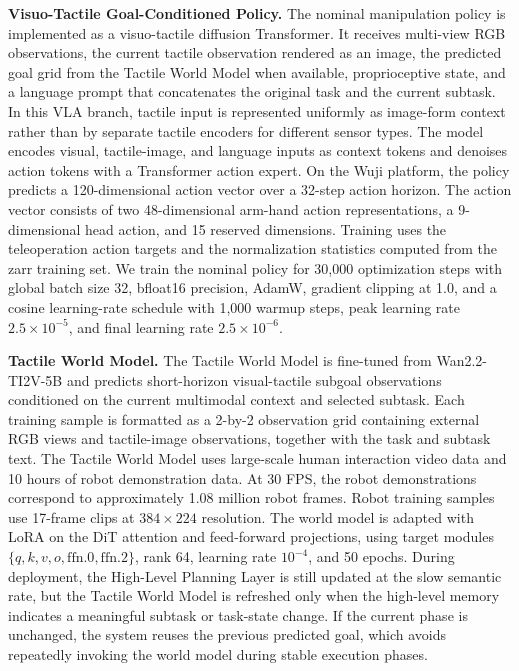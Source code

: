\noindent\textbf{Visuo-Tactile Goal-Conditioned Policy.}
The nominal manipulation policy is implemented as a visuo-tactile diffusion Transformer.
It receives multi-view RGB observations, the current tactile observation rendered as an image, the predicted goal grid from the Tactile World Model when available, proprioceptive state, and a language prompt that concatenates the original task and the current subtask.
In this VLA branch, tactile input is represented uniformly as image-form context rather than by separate tactile encoders for different sensor types.
The model encodes visual, tactile-image, and language inputs as context tokens and denoises action tokens with a Transformer action expert.
On the Wuji platform, the policy predicts a 120-dimensional action vector over a 32-step action horizon.
The action vector consists of two 48-dimensional arm-hand action representations, a 9-dimensional head action, and 15 reserved dimensions.
Training uses the teleoperation action targets and the normalization statistics computed from the zarr training set.
We train the nominal policy for 30,000 optimization steps with global batch size 32, bfloat16 precision, AdamW, gradient clipping at 1.0, and a cosine learning-rate schedule with 1,000 warmup steps, peak learning rate $2.5\times10^{-5}$, and final learning rate $2.5\times10^{-6}$.

\noindent\textbf{Tactile World Model.}
The Tactile World Model is fine-tuned from Wan2.2-TI2V-5B and predicts short-horizon visual-tactile subgoal observations conditioned on the current multimodal context and selected subtask.
Each training sample is formatted as a 2-by-2 observation grid containing external RGB views and tactile-image observations, together with the task and subtask text.
The Tactile World Model uses large-scale human interaction video data and 10 hours of robot demonstration data.
At 30 FPS, the robot demonstrations correspond to approximately 1.08 million robot frames.
Robot training samples use 17-frame clips at $384 \times 224$ resolution.
The world model is adapted with LoRA on the DiT attention and feed-forward projections, using target modules $\{q,k,v,o,\mathrm{ffn}.0,\mathrm{ffn}.2\}$, rank 64, learning rate $10^{-4}$, and 50 epochs.
During deployment, the High-Level Planning Layer is still updated at the slow semantic rate, but the Tactile World Model is refreshed only when the high-level memory indicates a meaningful subtask or task-state change.
If the current phase is unchanged, the system reuses the previous predicted goal, which avoids repeatedly invoking the world model during stable execution phases.

